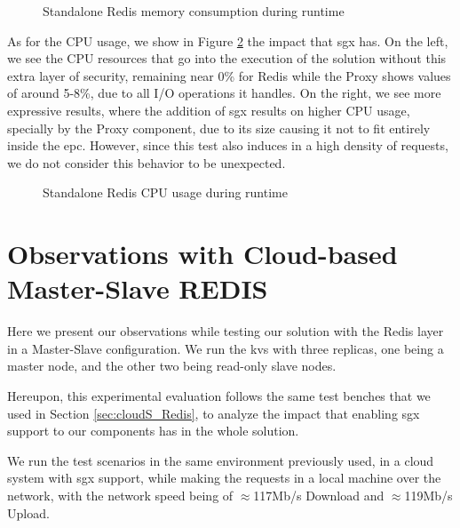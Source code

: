 \begin{figure}[htbp]
	\centering
	\caption{Standalone Redis memory consumption during runtime}
	\label{fig:MemoryConsumption_standalone}
\end{figure}

As for the CPU usage, we show in Figure \ref{fig:cpuUsageStandalone} the impact that \gls{sgx} has. On the left, we see the CPU resources that go into the execution of the solution without this extra layer of security, remaining near 0\% for Redis while the Proxy shows values of around 5-8\%, due to all I/O operations it handles. On the right, we see more expressive results, where the addition of \gls{sgx} results on higher CPU usage, specially by the Proxy component, due to its size causing it not to fit entirely inside the \gls{epc}. However, since this test also induces in a high density of requests, we do not consider this behavior to be unexpected.

\begin{figure}[htbp]
	\centering
	\caption{Standalone Redis CPU usage during runtime}
	\label{fig:cpuUsageStandalone}
\end{figure}

\section{Observations with Cloud-based Master-Slave REDIS}
\label{sec:cloud_MS_Redis}

Here we present our observations while testing our solution with the Redis layer in a Master-Slave configuration. We run the \gls{kvs} with three replicas, one being a master node, and the other two being read-only slave nodes. 

Hereupon, this experimental evaluation follows the same test benches that we used in Section \ref{sec:cloudS_Redis}, to analyze the impact that enabling \gls{sgx} support to our components has in the whole solution.

We run the test scenarios in the same environment previously used, in a cloud system with \gls{sgx} support, while making the requests in a local machine over the network, with the network speed being of $\approx$117Mb/s Download and $\approx$119Mb/s Upload.


